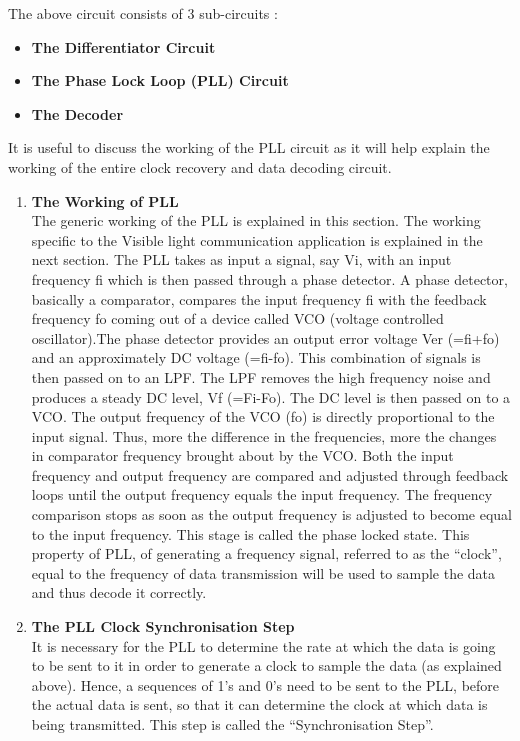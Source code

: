 \documentclass{article}
\begin{document}
The above circuit consists of 3 sub-circuits :
\begin{itemize}
\item \textbf{The Differentiator Circuit}
\item \textbf{The Phase Lock Loop (PLL) Circuit}
\item \textbf{The Decoder}
\end{itemize}
It is useful to discuss the working of the PLL circuit as it will help explain the working of the entire clock recovery and data decoding circuit.

\begin{enumerate}[label=(\Alph*)]
\item \textbf{The Working of PLL}\\
  The generic working of the PLL is explained in this section. The working specific to the Visible light communication application is explained in the next section. The PLL takes as input a signal, say Vi, with an input frequency fi which is then passed through a phase detector. A phase detector, basically a comparator, compares the input frequency fi with the feedback frequency fo coming out of a device called VCO (voltage controlled oscillator).The phase detector provides an output error voltage Ver (=fi+fo) and an approximately DC voltage (=fi-fo). This combination of signals is then passed on to an LPF. The LPF removes the high frequency noise and produces a steady DC level, Vf (=Fi-Fo). 
The DC level is then passed on to a VCO. The output frequency of the VCO (fo) is directly proportional to the input signal. Thus, more the difference in the frequencies, more the changes in comparator frequency brought about by the VCO. Both the input frequency and output frequency are compared and adjusted through feedback loops until the output frequency equals the input frequency. The frequency comparison stops as soon as the output frequency is adjusted to become equal to the input frequency. This stage is called the phase locked state. This property of PLL, of generating a frequency signal, referred to as the “clock”, equal to the frequency of data transmission will be used to sample the data and thus decode it correctly.

\item \textbf{The PLL Clock Synchronisation Step}\\
  It is necessary for the PLL to determine the rate at which the data is going to be sent to it in order to generate a clock to sample the data (as explained above). Hence, a sequences of 1’s and 0’s need to be sent to the PLL, before the actual data is sent, so that it can determine the clock at which data is being transmitted. This step is called the “Synchronisation Step”. 


\end{enumerate}
\end{document}
